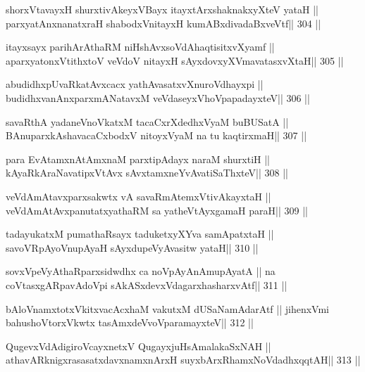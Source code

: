 \begin{shl}
shorxVtavayxH shurxtivAkeyxVBayx itayxtArx\s\s shaknakxyXteV yataH ||
parxyatAnxnanatxraH shabodxV\s nitayxH kumABxdivadaBxveVtf\hfill || 304 ||
\end{shl}

\begin{shl}
itayxsayx parihArAthaRM niHshAvxsoVdAhaqtisitxvXyamf ||
aparxyatonxVtithxtoV veVdoV nitayxH sAyxdovxyXVmavatasxvXtaH\hfill || 305 ||
\end{shl}

\begin{shl}
abudidhxpUvaRkatAvxcacx yathAvasatxvXnuroVdhayxpi ||
budidhxvanAnxparxmANatavxM veVdaseyxVhoVpapadayxteV\hfill || 306 ||
\end{shl}

\begin{shl}
savaRthA yadaneVnoVkatxM tacaCxrXdedhxVyaM buBUSatA ||
BAnuparxkAshavacaCxbodxV nitoyxV\s yaM na tu kaqtirxmaH\hfill || 307 ||
\end{shl}

\begin{shl}
para EvA\s\s tamxnA\s\s tAmxnaM parxtipAdayx naraM shurxtiH ||
kAyaRkAraNavatipxVtAvx sAvxtamxneYvAvatiSaThxteV\hfill || 308 ||
\end{shl}

\begin{shl}
veVdAmAtavxparxsakwtx vA savaRmAtemxVtivAkayxtaH ||
veVdAmAtAvxpanutatxyathaRM sa yatheVtAyxgamaH paraH\hfill || 309 ||
\end{shl}

\begin{shl}
tadayukatxM pumathaRsayx taduketxyXYva samApatxtaH ||
savoVRpAyoV\s nupAyaH sAyxdupeVyAvasitw yataH\hfill || 310 ||
\end{shl}

\begin{shl}
sovxVpeVyAthaRparxsidwdhx ca noVpAyAnAmupAyatA ||
na coVtasxgARpavAdoV\s pi sAkASxdevxVdagarxhasharxvAtf\hfill || 311 ||
\end{shl}

\begin{shl}
bAloVnamxtotxVkitxvacAcxhaM vakutxM dUSaNamAdarAtf ||
jihenxVmi bahushoV\s torxVkwtx tasAmxdeVvoVparamayxteV\hfill || 312 ||
\end{shl}

\begin{shl}
QugevxVdAdigiroVcayxnetxV QugayxjuHsAmalakaSxNAH ||
athavARknigxrasasatxdavxnamxnArxH suyxbArxRhamxNoVdadhxqqtAH\hfill || 313 ||
\end{shl}

